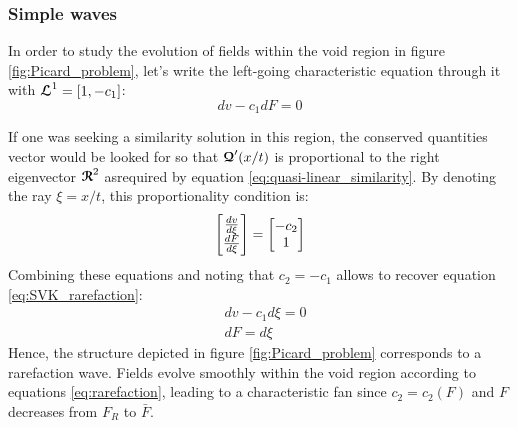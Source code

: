 \subsubsection*{Simple waves}
In order to study the evolution of fields within the void region in figure \ref{fig:Picard_problem}, let's write the left-going characteristic equation through it with ${\boldsymbol{\mathcal{L}}}^1=[1,-c_1]$:
\begin{equation}
  \label{eq:SVK_rarefaction}
  dv -c_1  dF = 0 %
\end{equation}

\begin{remark}
  If one was seeking a similarity solution in this region, the conserved quantities vector would be looked for so that ${\boldsymbol{\mathcal{Q}}}'(x/t)$ is proportional to the right eigenvector ${\boldsymbol{\mathcal{R}}}^2$ asrequired by equation \eqref{eq:quasi-linear_similarity}. By denoting the ray $\xi=x/t$, this proportionality condition is:
  \begin{equation*}
    \left[\begin{matrix}\frac{d v}{d \xi} \\ \frac{d F}{d \xi}\end{matrix}\right] = \left[\begin{matrix} -c_2 \\ 1\end{matrix}\right]
  \end{equation*}
  Combining these equations and noting that $c_2=-c_1$ allows to recover equation \eqref{eq:SVK_rarefaction}:
  \begin{equation}
    \label{eq:rarefaction}
    \begin{aligned}
      & dv -c_1 d\xi = 0\\
      & dF = d\xi
    \end{aligned}
  \end{equation}
Hence, the structure depicted in figure \ref{fig:Picard_problem} corresponds to a rarefaction wave. Fields evolve smoothly within the void region according to equations \eqref{eq:rarefaction}, leading to a characteristic fan since $c_2=c_2(F)$ and $F$ decreases from $F_R$ to $\bar{F}$.
\end{remark}


